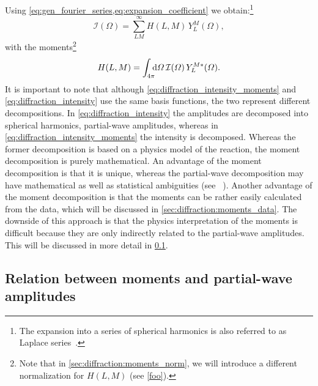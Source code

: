 Using \cref{eq:gen_fourier_series,eq:expansion_coefficient} we
obtain:\footnote{The expansion into a series of spherical harmonics is
also referred to as Laplace series~\cite{MathWorld:LaplaceSeries}.}
\begin{equation}
  \label{eq:diffraction_intensity_moments}
  \mathcal{I}(\Omega)
  = \sum_{L M}^\infty H(L, M)\, Y_L^M(\Omega),
\end{equation}
with the moments\footnote{\label{fn:moment_norm}Note that in
\cref{sec:diffraction:moments_norm}, we will introduce a different
normalization for $H(L, M)$ (see \cref{foo}).}
\begin{equation}
  \label{eq:diffraction_moments}
  H(L, M)
  = \int_{4 \pi}\!\!\! \dif{\Omega}\, \mathcal{I}(\Omega)\, Y_L^{M *}(\Omega).
\end{equation}
It is important to note that although
\cref{eq:diffraction_intensity_moments} and
\cref{eq:diffraction_intensity} use the same basis functions, the two
represent different decompositions.  In
\cref{eq:diffraction_intensity} the amplitudes are decomposed into
spherical harmonics, \ie partial-wave amplitudes, whereas in
\cref{eq:diffraction_intensity_moments} the intensity is decomposed.
Whereas the former decomposition is based on a physics model of the
reaction, the moment decomposition is purely mathematical.  An
advantage of the moment decomposition is that it is unique, whereas
the partial-wave decomposition may have mathematical as well as
statistical ambiguities (see \eg\ ).  Another
advantage of the moment decomposition is that the moments can be
rather easily calculated from the data, which will be discussed in
\cref{sec:diffraction:moments_data}.  The downside of this approach is
that the physics interpretation of the moments is difficult because
they are only indirectly related to the partial-wave amplitudes.  This
will be discussed in more detail in \cref{sec:diffraction:moments_pw}.


\subsection{Relation between moments and partial-wave amplitudes}%
\label{sec:diffraction:moments_pw}

